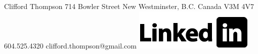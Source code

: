 %
%
%
%
%

\resumeheader
{Clifford Thompson}
{714 Bowler Street}
{New Westminster, B.C.}
{Canada V3M 4V7}
{604.525.4320}
{clifford.thompson@gmail.com}
{\href{http://www.linkedin.com/in/cliffordjthompson}{\includegraphics[scale=0.15]{images/linkedin.jpg}}}
